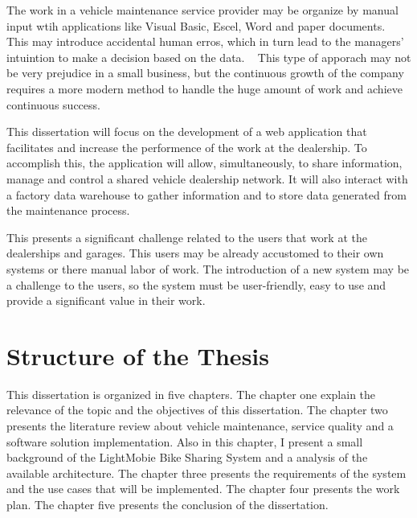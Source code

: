 The work in a vehicle maintenance service provider may be organize by manual input wtih applications like Visual Basic, Escel, Word and paper documents. ~\cite{MAS_MOTORS} 
This may introduce accidental human erros, which in turn lead to the managers' intuintion to make a decision based on the data. ~\cite{MAS_MOTORS}
This type of apporach may not be very prejudice in a small business, but the continuous growth of the company requires a more modern method to handle the huge amount of work and achieve continuous success. ~\cite{MAS_MOTORS}

This dissertation will focus on the development of a web application that facilitates and increase the performence of the work at the dealership.
To accomplish this, the application will allow, simultaneously, to share information, manage and control a shared vehicle dealership network.
It will also interact with a factory data warehouse to gather information and to store data generated from the maintenance process. 

This presents a significant challenge related to the users that work at the dealerships and garages. 
This users may be already accustomed to their own systems or there manual labor of work.  
The introduction of a new system may be a challenge to the users, so the system must be user-friendly, easy to use and provide a significant value in their work.

\section{Structure of the Thesis}

This dissertation is organized in five chapters. The chapter one explain the relevance of the topic and the objectives of this dissertation.
The chapter two presents the literature review about vehicle maintenance, service quality and a software solution implementation. 
Also in this chapter, I present a small background of the LightMobie Bike Sharing System and a analysis of the available architecture.
The chapter three presents the requirements of the system and the use cases that will be implemented.
The chapter four presents the work plan.
The chapter five presents the conclusion of the dissertation. 

